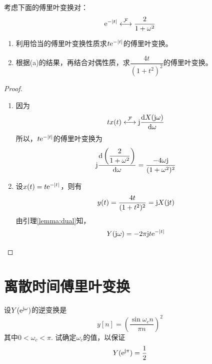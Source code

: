 \begin{proposition}

    考虑下面的傅里叶变换对：
    \[\mathrm{e}^{-|t|} \stackrel{\mathcal{F}}{\longleftrightarrow} \dfrac{2}{1 + \omega^2}\]

    \begin{enumerate}

        \item 利用恰当的傅里叶变换性质求$t\mathrm{e}^{-|t|}$的傅里叶变换。
        
        \item 根据\textup{(a)}的结果，再结合对偶性质，求$\dfrac{4t}{(1 + t^2)^2}$的傅里叶变换。

    \end{enumerate}

\end{proposition}

\begin{proof}

    \begin{enumerate}

        \item 
            因为
            \[tx(t) \stackrel{\mathcal{F}}{\longleftrightarrow} \mathrm{j} \dfrac{\mathrm{d} X(\mathrm{j} \omega)}{\mathrm{d} \omega}\]
            所以，$t\mathrm{e}^{-|t|}$的傅里叶变换为
            \[\mathrm{j} \dfrac{\mathrm{d} \left( \dfrac{2}{1 + \omega^2} \right)}{\mathrm{d} \omega} = \dfrac{-4\omega \mathrm{j}}{(1 + \omega^2)^2}\]
        
        \item 
            设$x(t) = t\mathrm{e}^{-|t|}$，则有
            \[y(t) = \dfrac{4t}{(1 + t^2)^2} = \mathrm{j} X(\mathrm{j} t)\]
            由引理\ref{lemma:dual}知，
            \[Y(\mathrm{j} \omega) = -2 \pi \mathrm{j} t \mathrm{e}^{-|t|}\]

    \end{enumerate}

\end{proof}

\section{离散时间傅里叶变换}

\begin{proposition}
    
    设$Y(\mathrm{e}^{\mathrm{j} \omega})$的逆变换是
    \[y[n] = \left( \dfrac{\sin{\omega_c n}}{\pi n} \right)^2\]
    其中$0 < \omega_c < \pi$. 试确定$\omega_c$的值，以保证
    \[Y(\mathrm{e}^{\mathrm{j} \pi}) = \dfrac{1}{2}\]

\end{proposition}

